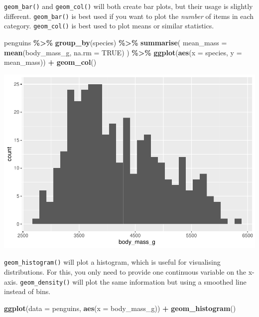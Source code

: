 \documentclass[
]{book}
\newenvironment{Shaded}{\begin{snugshade}}{\end{snugshade}}
\newcommand{\AttributeTok}[1]{\textcolor[rgb]{0.13,0.29,0.53}{#1}}
\newcommand{\ConstantTok}[1]{\textcolor[rgb]{0.56,0.35,0.01}{#1}}
\newcommand{\FunctionTok}[1]{\textcolor[rgb]{0.13,0.29,0.53}{\textbf{#1}}}
\newcommand{\NormalTok}[1]{#1}
\newcommand{\SpecialCharTok}[1]{\textcolor[rgb]{0.81,0.36,0.00}{\textbf{#1}}}
\begin{document}
\texttt{geom\_bar()} and \texttt{geom\_col()} will both create bar plots, but their usage is slightly different. \texttt{geom\_bar()} is best used if you want to plot the \emph{number} of items in each category. \texttt{geom\_col()} is best used to plot means or similar statistics.

\begin{Shaded}
\begin{Highlighting}[]
\NormalTok{penguins }\SpecialCharTok{\%\textgreater{}\%}
  \FunctionTok{group\_by}\NormalTok{(species) }\SpecialCharTok{\%\textgreater{}\%}
  \FunctionTok{summarise}\NormalTok{(}
    \AttributeTok{mean\_mass =} \FunctionTok{mean}\NormalTok{(body\_mass\_g, }\AttributeTok{na.rm =} \ConstantTok{TRUE}\NormalTok{)}
\NormalTok{  ) }\SpecialCharTok{\%\textgreater{}\%}
  \FunctionTok{ggplot}\NormalTok{(}\FunctionTok{aes}\NormalTok{(}\AttributeTok{x =}\NormalTok{ species, }\AttributeTok{y =}\NormalTok{ mean\_mass)) }\SpecialCharTok{+}
  \FunctionTok{geom\_col}\NormalTok{()}
\end{Highlighting}
\end{Shaded}

\includegraphics{_main_files/figure-latex/unnamed-chunk-57-1.pdf}

\texttt{geom\_histogram()} will plot a histogram, which is useful for visualising distributions. For this, you only need to provide one continuous variable on the x-axis. \texttt{geom\_density()} will plot the same information but using a smoothed line instead of bins.

\begin{Shaded}
\begin{Highlighting}[]
\FunctionTok{ggplot}\NormalTok{(}\AttributeTok{data =}\NormalTok{ penguins, }\FunctionTok{aes}\NormalTok{(}\AttributeTok{x =}\NormalTok{ body\_mass\_g)) }\SpecialCharTok{+} 
  \FunctionTok{geom\_histogram}\NormalTok{()}
\end{Highlighting}
\end{Shaded}
\end{document}
